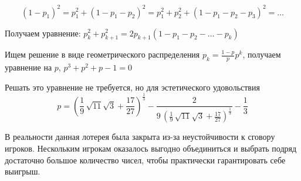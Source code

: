 \begin{problem}
\begin{sol}
\[
(1-p_1)^2 = p_1^2+(1-p_1-p_2)^2 = p_1^2+p_2^2+(1-p_1-p_2-p_3)^2 =\ldots
\]

Получаем уравнение:
$p_{k}^{2}+p_{k+1}^{2}=2p_{k+1}(1-p_{1}-p_{2}-\ldots -p_{k})$

Ищем решение в виде геометрического распределения $p_{k}=\frac{1-p}{p}p^{k}$, получаем уравнение на $p$,
$p^{3}+p^{2}+p-1=0$

Решать это уравнение не требуется, но для эстетического удовольствия
\[
p = {\left(\frac{1}{9} \, \sqrt{11} \sqrt{3} + \frac{17}{27}\right)}^{\frac{1}{3}} - \frac{2}{9 \, {\left(\frac{1}{9} \, \sqrt{11} \sqrt{3} + \frac{17}{27}\right)}^{\frac{1}{3}}} - \frac{1}{3}
\]

В реальности данная лотерея была закрыта из-за неустойчивости к сговору игроков. Нескольким игрокам оказалось выгодно объединиться и выбрать подряд достаточно большое количество чисел, чтобы практически гарантировать себе выигрыш.
\end{sol}
\end{problem}


